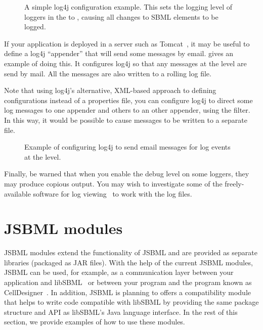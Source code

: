 \begin{figure}[t]
  \caption{A simple log4j configuration example.  This sets the logging
    level of loggers in the  to ,
    causing all changes to SBML elements to be logged.}
  \label{fig:log4j-simple-example}
\end{figure}

If your application is deployed in a server such as Tomcat~\cite{tomcat},
it may be useful to define a log4j ``appender'' that will send some
messages by email.   gives an example
of doing this.  It configures log4j so that any messages at the
 level  are send by mail. All the messages are
also written to a rolling log file.

Note that using log4j's alternative, XML-based approach to defining
configurations instead of a properties file, you can configure log4j to
direct some log messages %
to one appender and others to an other appender, using the
 filter. In this way, it would be possible to cause
 messages to be written to a separate file.

\begin{figure}[t]
  \caption{Example of configuring log4j to send email messages for log
    events at the  level.}
  \label{fig:log4j-email-example}
\end{figure}

Finally, be warned that when you enable the debug level  on
some loggers, they may produce copious output.  You may wish to investigate
some of the freely-available software for log
viewing~\cite{logViewersWebpage} to work with the log files.


\section{JSBML modules}
\label{sec:jsbml-modules-details}

JSBML modules extend the functionality of JSBML and are provided as
separate libraries (packaged as JAR files). With the help of the current
JSBML modules, JSBML can be used, for example, as a communication layer
 between your application and
libSBML~\citep{Bornstein2008} or between your program and the program known
as CellDesigner~\citep{Funahashi2003}. In addition, JSBML is planning to offers a
compatibility module %
that helps to write code compatible with libSBML by providing the same package 
structure and API as libSBML's Java
language interface. In the rest of this section, we provide examples of how
to use these modules.



